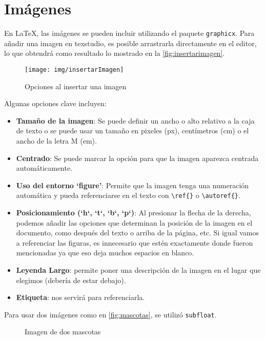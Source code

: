 \section{Imágenes}
En \LaTeX, las imágenes se pueden incluir utilizando el paquete \texttt{graphicx}. 
Para añadir una imagen en texstudio, es posible arrastrarla directamente en el editor, lo que obtendrá como resultado lo mostrado en la \autoref{fig:insertarimagen}.

\begin{figure}[h]
	\centering
	\texttt{[image: img/insertarImagen]}
	\caption{Opciones al insertar una imagen}
	\label{fig:insertarimagen}
\end{figure}
\cit
Algunas opciones clave incluyen:

\begin{itemize}
	\item \textbf{Tamaño de la imagen}: Se puede definir un ancho o alto relativo a la caja de texto o se puede usar un tamaño en pixeles (px), centímetros (cm) o el ancho de la letra M (em).
	\item \textbf{Centrado}: Se puede marcar la opción para que la imagen aparezca centrada automáticamente.
	\item \textbf{Uso del entorno `figure'}: Permite que la imagen tenga una numeración automática y pueda referenciarse en el texto con \texttt{\textbackslash ref\{\}} o \texttt{\textbackslash autoref\{\}}.
	\item \textbf{Posicionamiento (`h`, `t`, `b`, `p`)}: Al presionar la flecha de la derecha, podemos añadir las opciones que determinan la posición de la imagen en el documento, como después del texto o arriba de la página, etc. Si igual vamos a referenciar las figuras, es innecesario que estén exactamente donde fueron mencionadas ya que eso deja muchos espacios en blanco.
	\item \textbf{Leyenda Largo}: permite poner una descripción de la imagen en el lugar que elegimos (debería de estar debajo).
	\item \textbf{Etiqueta}: nos servirá para referenciarla. 
\end{itemize}

Para usar dos imágenes como en \autoref{fig:mascotas}, se utilizó \texttt{subfloat}.
\begin{figure}[h]
	\centering
	\hfill
	\caption{Imagen de dos mascotas}
	\label{fig:mascotas}
\end{figure}